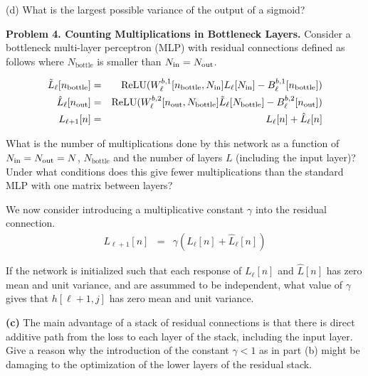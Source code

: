\documentclass{article}
\newcommand{\solution}[1]{}
\begin{document}
\medskip
(d) What is the largest possible variance of the output of a sigmoid?

\solution{
  The larest valriance occurs when $y = \infty$ with probability 1/2 and $y = -\infty$ with probability 1/2 ;-).  Tn this case $f(y)$ is 0 with probability 1/2 and 1 with probability 1/2.
  Which gives a variance of 1/4.
}

\bigskip
{\bf Problem 4. Counting Multiplications in Bottleneck Layers.} Consider a bottleneck multi-layer perceptron (MLP) with residual connections
defined as follows where $N_{\mathrm{bottle}}$ is smaller than $N_{\mathrm{in}} = N_{\mathrm{out}}$.

\begin{eqnarray*}
  \tilde{L}_\ell[n_{\mathrm{bottle}}] & = & \mathrm{ReLU}(W^{b,1}_\ell[n_{\mathrm{bottle}},N_{\mathrm{in}}]L_\ell[N_{\mathrm{in}}] - B^{b,1}_\ell[n_{\mathrm{bottle}}]) \\
  \hat{L}_\ell[n_{\mathrm{out}}] & = & \mathrm{ReLU}(W^{b,2}_\ell[n_{\mathrm{out}},N_{\mathrm{bottle}}]\tilde{L}_\ell[N_{\mathrm{bottle}}] - B^{b,2}_\ell[n_{\mathrm{out}}]) \\
  L_{\ell+1}[n] & = & L_\ell[n] + \hat{L}_\ell[n]
\end{eqnarray*}

 What is the number of multiplications done by this network as a function of $N_{\mathrm{in}}
= N_{\mathrm{out}} = N$, $N_{\mathrm{bottle}}$ and the number of layers $L$ (including the input layer)?  Under
what conditions does this give fewer multiplications than the standard MLP with one matrix between
layers?


\solution{The number of multiplications is $2NN_{\mathrm{bottle}}(L-1)$.  For a standard MLP (with
  no botleneck) the number of multiplications is $N^2(L-1)$.  The bottleneck layer has fewer
  multiplications for $N_{\mathrm{bottle}} < N/2$.}


 We now consider introducing a multiplicative constant $\gamma$ into the residual connection.
\begin{eqnarray*}
  L_{\ell+1}[n] & = & \gamma(L_\ell[n] + \hat{L}_\ell[n])
\end{eqnarray*}

If the network is initialized such that each response of $L_\ell[n]$ and $\hat{L}[n]$ has zero
mean and unit variance, and are assummed to be independent, what value of $\gamma$ gives that
$h[\ell+1,j]$ has zero mean and unit variance.

\solution{$1/\sqrt{2}$}
  
\medskip
{\bf (c)} The main advantage of a stack of residual connections is that there is direct additive
path from the loss to each layer of the stack, including the input layer.  Give a reason why the
introduction of the constant $\gamma < 1$ as in part (b) might be damaging to the optimization of
the lower layers of the residual stack.
\end{document}
